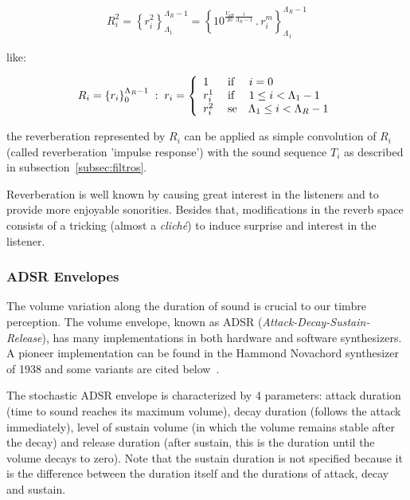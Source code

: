 \documentclass[
 aip,
 jmp,
 amsmath,amssymb,
 reprint,
]{revtex4-1}
\begin{document}
\begin{equation}\label{eq:p2rev}
    R_i^2=\left\{r_i^2\right\}_{\Lambda_1}^{\Lambda_R-1}=\left\{10^{\frac{V_{dB}}{20}\frac{i}{\Lambda_R-1}}\,.\,r_i^m\right\}_{\Lambda_1}^{\Lambda_R-1}
\end{equation}

\noindent like:

\begin{equation}\label{eq:rev}
    R_i=\left\{r_i\right\}_0^{\Lambda_R-1}\;:\;r_i=\left\{
        \begin{array}{l l}
            1\; & \text{if }\quad i=0 \\
            r_i^1\;  & \text{if }\quad 1\leq i<\Lambda_1-1 \\
                                     r_i^2 \; & \text{se}\quad \Lambda_1 \leq i < \Lambda_R-1 \\
        \end{array} \right.
\end{equation}

\noindent the reverberation represented by $R_i$ can be applied as simple
        convolution of $R_i$ (called reverberation 'impulse response') with the sound sequence $T_i$ as described in subsection~\ref{subsec:filtros}.

Reverberation is well known by causing great interest in the listeners and to provide more enjoyable sonorities. Besides that, modifications in the reverb
space consists of a tricking (almost a \textit{clich\'{e}}) to induce surprise and interest in the listener.


\subsubsection{ADSR Envelopes}

The volume variation along the duration of sound is crucial to our timbre
perception. The volume envelope, known as ADSR (\emph{Attack-Decay-Sustain-Release}), has many implementations in both hardware and software synthesizers. A pioneer implementation can be found in the Hammond
Novachord synthesizer of 1938 and some variants are cited below~\cite{ADSR}.

The stochastic ADSR envelope is characterized by 4 parameters: attack duration
(time to sound reaches its maximum volume), decay duration (follows the attack
immediately), level of sustain volume (in which the volume remains stable after the decay) and release duration (after sustain, this is the duration until the volume decays to zero). Note that the sustain duration is not specified because it is the difference between the duration itself and the durations of attack, decay and sustain.
\end{document}
